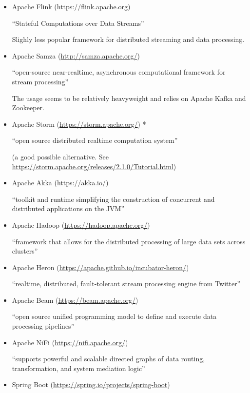         \begin{itemize}
            \item Apache Flink (\url{https://flink.apache.org})
                
                \enquote{Stateful Computations over Data Streams}
                
                Slighly less popular framework for distributed streaming and data processing.
            \item Apache Samza (\url{http://samza.apache.org/})
            
                \enquote{open-source near-realtime, asynchronous computational framework for stream processing}
                
                The usage seems to be relatively heavyweight and relies on Apache Kafka and Zookeeper.
            \item Apache Storm (\url{https://storm.apache.org/}) *
                
                \enquote{open source distributed realtime computation system}
                
                (a good possible alternative. See \url{https://storm.apache.org/releases/2.1.0/Tutorial.html})
            \item Apache Akka (\url{https://akka.io/})
            
                \enquote{toolkit and runtime simplifying the construction of concurrent and distributed applications on the JVM}
            \item Apache Hadoop (\url{https://hadoop.apache.org/})
                
                \enquote{framework that allows for the distributed processing of large data sets across clusters}
            \item Apache Heron (\url{https://apache.github.io/incubator-heron/})
            
                \enquote{realtime, distributed, fault-tolerant stream processing engine from Twitter}
            \item Apache Beam (\url{https://beam.apache.org/})
            
                \enquote{open source unified programming model to define and execute data processing pipelines}
            \item Apache NiFi (\url{https://nifi.apache.org/})
                
                \enquote{supports powerful and scalable directed graphs of data routing, transformation, and system mediation logic}
            \item Spring Boot (\url{https://spring.io/projects/spring-boot})
                

\end{itemize}
